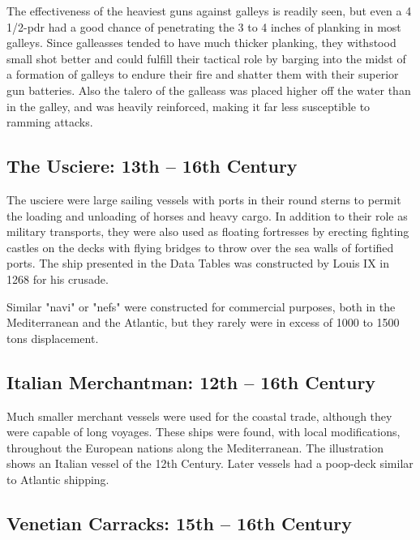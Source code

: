 \documentclass{article}
\begin{document}
\begin{multicols}{3}
The effectiveness of the heaviest guns against galleys is readily
seen, but even a 4 1/2-pdr had a good chance of penetrating the 3 to 4
inches of planking in most galleys.  Since galleasses tended to have
much thicker planking, they withstood small shot better and could
fulfill their tactical role by barging into the midst of a formation
of galleys to endure their fire and shatter them with their superior
gun batteries.  Also the talero of the galleass was placed higher off
the water than in the galley, and was heavily reinforced, making it
far less susceptible to ramming attacks.


\subsection{The Usciere:  13th -- 16th Century}

The usciere were large sailing vessels with ports in their round
sterns to permit the loading and unloading of horses and heavy cargo.
In addition to their role as military transports, they were also used
as floating fortresses by erecting fighting castles on the decks with
flying bridges to throw over the sea walls of fortified ports.  The
ship presented in the Data Tables was constructed by Louis IX in 1268
for his crusade.

Similar "navi" or "nefs" were constructed for commercial purposes,
both in the Mediterranean and the Atlantic, but they rarely were in
excess of 1000 to 1500 tons displacement.

\subsection{Italian Merchantman:  12th -- 16th Century}

Much smaller merchant vessels were used for the coastal trade,
although they were capable of long voyages.  These ships were found,
with local modifications, throughout the European nations along the
Mediterranean.  The illustration shows an Italian vessel of the 12th
Century.  Later vessels had a poop-deck similar to Atlantic shipping.

\subsection{Venetian Carracks:  15th -- 16th Century}


\end{multicols}
\end{document}
